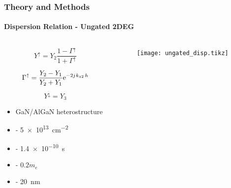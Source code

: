 \documentclass[mathserif,16pt,xcolor=table]{beamer}
\begin{document}
      \begin{frame}
        \frametitle{Theory and Methods}
        \framesubtitle{Dispersion Relation - Ungated 2DEG}
        \begin{columns}[T] %
          \begin{column}{.5\textwidth}
            \begin{equation} \nonumber
              Y^{\uparrow} = Y_{2} \frac{1 - \Gamma^{\uparrow}}{1 + \Gamma^{\uparrow}}
            \end{equation}

            \begin{equation} \nonumber
              \Gamma^{\uparrow} = \frac{Y_2 - Y_1}{Y_2 + Y_1} \mathrm{e}^{-2{j}\mkern1mu k_{z2}\, h}
            \end{equation}

            \begin{equation} \nonumber
              Y^{\downarrow} = Y_{3}
            \end{equation}
            \begin{itemize}
              \item[] GaN/AlGaN heterostructure
              \item[] { - \SI{5e13}{\cm^{-2}}}
              \item[] {\makebox[.3cm][l]{$\tau$} - \SI{1.4e-10}{\s}}
              \item[] { - $0.2 m_e$}
              \item[] { - \SI{20}{\nm}}
            \end{itemize}
          \end{column}
          \begin{column}[T]{.45\textwidth}
            \vspace*{-1cm}
            \begin{figure}
              \centering
              \fontsize{6}{7}\selectfont
              \def\svgwidth{1.\linewidth}
              
            \end{figure}
            \begin{figure} \vspace*{-.5cm} \centering
              \texttt{[image: ungated\_disp.tikz]}
              \label{fig:cond_2deg}
            \end{figure}
          \end{column}
        \end{columns}
      \end{frame}
\end{document}
